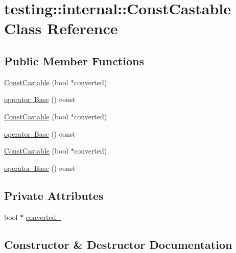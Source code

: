 \hypertarget{classtesting_1_1internal_1_1_const_castable}{}\section{testing\+::internal\+::Const\+Castable Class Reference}
\label{classtesting_1_1internal_1_1_const_castable}
\subsection*{Public Member Functions}
\begin{DoxyCompactItemize}
\item 
\mbox{\hyperlink{classtesting_1_1internal_1_1_const_castable_a78eba470cc71528237a33a10a92fba7e}{Const\+Castable}} (bool $\ast$converted)
\item 
\mbox{\hyperlink{classtesting_1_1internal_1_1_const_castable_af084893d6786010022297b1e88f4743b}{operator Base}} () const
\item 
\mbox{\hyperlink{classtesting_1_1internal_1_1_const_castable_a78eba470cc71528237a33a10a92fba7e}{Const\+Castable}} (bool $\ast$converted)
\item 
\mbox{\hyperlink{classtesting_1_1internal_1_1_const_castable_af084893d6786010022297b1e88f4743b}{operator Base}} () const
\item 
\mbox{\hyperlink{classtesting_1_1internal_1_1_const_castable_a78eba470cc71528237a33a10a92fba7e}{Const\+Castable}} (bool $\ast$converted)
\item 
\mbox{\hyperlink{classtesting_1_1internal_1_1_const_castable_af084893d6786010022297b1e88f4743b}{operator Base}} () const
\end{DoxyCompactItemize}
\subsection*{Private Attributes}
\begin{DoxyCompactItemize}
\item 
bool $\ast$ \mbox{\hyperlink{classtesting_1_1internal_1_1_const_castable_a55ab99cae88b6cf81c14a9f22e7092b0}{converted\+\_\+}}
\end{DoxyCompactItemize}


\subsection{Constructor \& Destructor Documentation}
\mbox{\label{classtesting_1_1internal_1_1_const_castable_a78eba470cc71528237a33a10a92fba7e}} 

